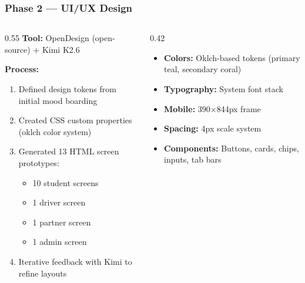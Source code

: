\documentclass[aspectratio=169,professionalfonts,10pt]{beamer}
\begin{document}
\begin{frame}
    \frametitle{Phase 2 --- UI/UX Design}
    \small
    \begin{columns}[T]
        \begin{column}{0.55\textwidth}
            \textbf{Tool:} OpenDesign (open-source) + Kimi K2.6

            \vspace{0.3em}
            \textbf{Process:}
            \begin{enumerate}\setlength{\itemsep}{1pt}
                \item Defined design tokens from initial mood boarding
                \item Created CSS custom properties (oklch color system)
                \item Generated 13 HTML screen prototypes:
                \begin{itemize}\scriptsize
                    \item 10 student screens
                    \item 1 driver screen
                    \item 1 partner screen
                    \item 1 admin screen
                \end{itemize}
                \item Iterative feedback with Kimi to refine layouts
            \end{enumerate}
        \end{column}

        \begin{column}{0.42\textwidth}
            \begin{tcolorbox}[colback=ugmLightGrey,colframe=ugmBlue,title=\small Design System]
                \scriptsize
                \begin{itemize}\setlength{\itemsep}{1pt}
                    \item \textbf{Colors:} Oklch-based tokens (primary teal, secondary coral)
                    \item \textbf{Typography:} System font stack
                    \item \textbf{Mobile:} 390$\times$844px frame
                    \item \textbf{Spacing:} 4px scale system
                    \item \textbf{Components:} Buttons, cards, chips, inputs, tab bars
                \end{itemize}
            \end{tcolorbox}
        \end{column}
    \end{columns}
\end{frame}
\end{document}
